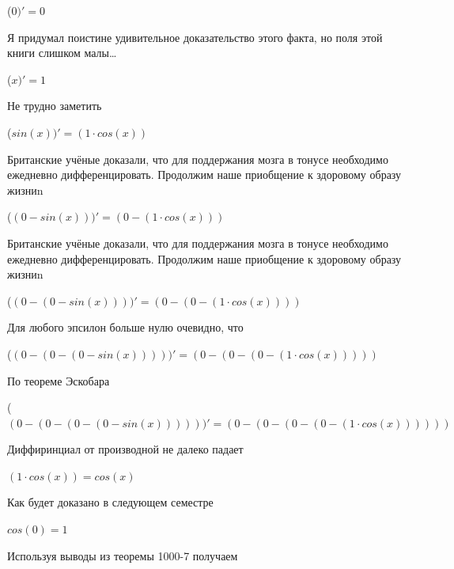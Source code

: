 \documentclass[12pt,a4paper,fleqn]{article}
\begin{document}
\begin{center}
\begin{center}
\begin{center}
\begin{center}
\begin{center}
\begin{center}
\begin{center}
\begin{center}
\begin{center}
\begin{center}
\begin{center}
\begin{center}
\begin{center}
\begin{center}
\begin{center}
\begin{center}
\begin{center}
\begin{center}
\begin{center}
\begin{center}
\begin{center}
\begin{center}
\begin{center}
\begin{center}
\begin{center}
\begin{center}
\begin{center}
\begin{center}
\begin{center}
\begin{center}
\begin{center}
\begin{center}
\begin{center}
\begin{center}
 ($0)'
  = 0$\end{center}
Я придумал поистине удивительное доказательство этого факта, но поля этой книги слишком малы\ldots

\begin{center}
 ($x)'
  = 1$\end{center}
Не трудно заметить

\begin{center}
 ($sin(x))'
  = (1 \cdot cos(x))$\end{center}
Британские учёные доказали, что для поддержания мозга в тонусе необходимо ежедневно дифференцировать. Продолжим наше приобщение к здоровому образу жизниn

\begin{center}
 ($(0-sin(x)))'
  = (0-(1 \cdot cos(x)))$\end{center}
Британские учёные доказали, что для поддержания мозга в тонусе необходимо ежедневно дифференцировать. Продолжим наше приобщение к здоровому образу жизниn

\begin{center}
 ($(0-(0-sin(x))))'
  = (0-(0-(1 \cdot cos(x))))$\end{center}
Для любого эпсилон больше нулю очевидно, что

\begin{center}
 ($(0-(0-(0-sin(x)))))'
  = (0-(0-(0-(1 \cdot cos(x)))))$\end{center}
По теореме Эскобара

\begin{center}
 ($(0-(0-(0-(0-sin(x))))))'
  = (0-(0-(0-(0-(1 \cdot cos(x))))))$\end{center}
Диффиринциал от производной не далеко падает\cite{link2}

\begin{center}
$(1 \cdot cos(x)) = cos(x)$\end{center}
Как будет доказано в следующем семестре

\begin{center}
\begin{center}$cos(0) = 1$\end{center}
Используя выводы из теоремы 1000-7 получаем


\end{center}
\end{center}
\end{center}
\end{center}
\end{center}
\end{center}
\end{center}
\end{center}
\end{center}
\end{center}
\end{center}
\end{center}
\end{center}
\end{center}
\end{center}
\end{center}
\end{center}
\end{center}
\end{center}
\end{center}
\end{center}
\end{center}
\end{center}
\end{center}
\end{center}
\end{center}
\end{center}
\end{center}
\end{center}
\end{center}
\end{center}
\end{center}
\end{center}
\end{center}
\end{document}
